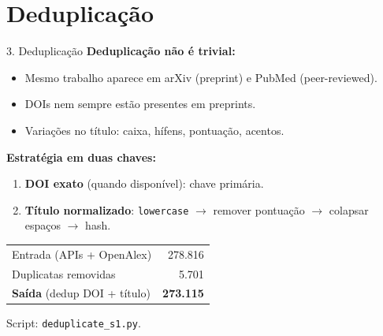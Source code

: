 \documentclass[aspectratio=169]{beamer}
\begin{document}
\section{Deduplicação}
\begin{frame}{3. Deduplicação}
\small
\textbf{Deduplicação não é trivial:}
\begin{itemize}
	\item Mesmo trabalho aparece em arXiv (preprint) e PubMed (peer-reviewed).
	\item DOIs nem sempre estão presentes em preprints.
	\item Variações no título: caixa, hífens, pontuação, acentos.
\end{itemize}

\textbf{Estratégia em duas chaves:}
\begin{enumerate}
	\item \textbf{DOI exato} (quando disponível): chave primária.
	\item \textbf{Título normalizado}: \texttt{lowercase} $\to$ remover pontuação $\to$ colapsar espaços $\to$ hash.
\end{enumerate}

\begin{table}
\centering
\begin{tabular}{lr}
\toprule
Entrada (APIs + OpenAlex) & 278.816 \\
Duplicatas removidas & 5.701 \\
\textbf{Saída} (dedup DOI + título) & \textbf{273.115} \\
\bottomrule
\end{tabular}
\end{table}
\footnotesize Script: \texttt{deduplicate\_s1.py}.
\end{frame}

\end{document}

